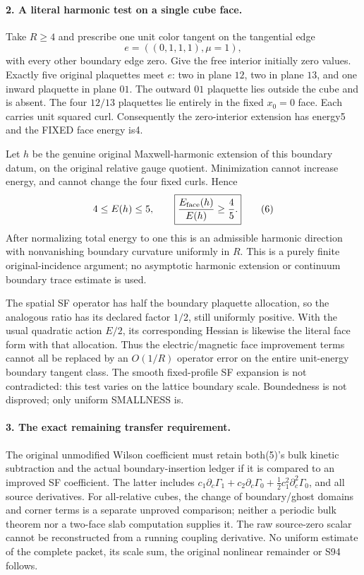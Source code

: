 \documentclass[11pt]{article}
\begin{document}
\paragraph{2. A literal harmonic test on a single cube face.}
Take $R\ge4$ and prescribe one unit color tangent on the tangential
edge
\[
 e=((0,1,1,1),\mu=1),
\]
with every other boundary edge zero. Give the free interior initially
zero values. Exactly five original plaquettes meet $e$: two in plane $12$,
two in plane $13$, and one inward plaquette in plane $01$. The outward $01$
plaquette lies outside the cube and is absent. The four $12/13$ plaquettes
lie entirely in the fixed $x_0=0$ face. Each carries unit squared curl.
Consequently the zero-interior extension has energy5 and the FIXED
face energy is4.

Let $h$ be the genuine original Maxwell-harmonic extension of this
boundary datum, on the original relative gauge quotient. Minimization
cannot increase energy, and cannot change the four fixed curls. Hence
\[
 4\le E(h)\le5,\qquad
 \boxed{\frac{E_{\rm face}(h)}{E(h)}\ge\frac45.}               \tag{6}
\]
After normalizing total energy to one this is an admissible harmonic
direction with nonvanishing boundary curvature uniformly in $R$.
This is a purely finite original-incidence argument; no asymptotic
harmonic extension or continuum boundary trace estimate is used.

The spatial SF operator has half the boundary plaquette allocation,
so the analogous ratio has its declared factor $1/2$, still uniformly
positive. With the usual quadratic action $E/2$, its corresponding
Hessian is likewise the literal face form with that allocation.
Thus the electric/magnetic face improvement terms cannot all be
replaced by an $O(1/R)$ operator error on the entire unit-energy
boundary tangent class. The smooth fixed-profile SF expansion is not
contradicted: this test varies on the lattice boundary scale.
Boundedness is not disproved; only uniform SMALLNESS is.

\paragraph{3. The exact remaining transfer requirement.}
The original unmodified Wilson coefficient must retain both(5)'s bulk
kinetic subtraction and the actual boundary-insertion ledger if it is
compared to an improved SF coefficient. The latter includes
$c_1\partial_c\Gamma_1+c_2\partial_c\Gamma_0+
\frac12c_1^2\partial_c^2\Gamma_0$, and all source derivatives.
For all-relative cubes, the change of boundary/ghost domains and
corner terms is a separate unproved comparison; neither a periodic
bulk theorem nor a two-face slab computation supplies it.
The raw source-zero scalar cannot be reconstructed from a running
coupling derivative. No uniform estimate of the complete packet,
its scale sum, the original nonlinear remainder or S94 follows.
\end{document}
